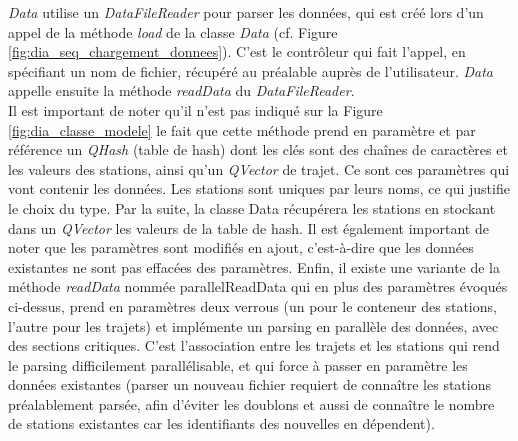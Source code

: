 \documentclass[12pt]{article}
\begin{document}
		\textit{Data} utilise un \textit{DataFileReader} pour parser les données, qui est créé lors d’un appel de la méthode \textit{load} de la classe \textit{Data} (cf. Figure \ref{fig:dia_seq_chargement_donnees}). C’est le contrôleur qui fait l’appel, en spécifiant un nom de fichier, récupéré au préalable auprès de l’utilisateur. \textit{Data} appelle ensuite la méthode \textit{readData} du \textit{DataFileReader}.\\
	
		Il est important de noter qu’il n’est pas indiqué sur la Figure \ref{fig:dia_classe_modele} le fait que cette méthode prend en paramètre et par référence un \textit{QHash} (table de hash) dont les clés sont des chaînes de caractères et les valeurs des stations, ainsi qu’un \textit{QVector} de trajet. Ce sont ces paramètres qui vont contenir les données. Les stations sont uniques par leurs noms, ce qui justifie le choix du type. Par la suite, la classe Data récupérera les stations en stockant dans un \textit{QVector} les valeurs de la table de hash. Il est également important de noter que les paramètres sont modifiés en ajout, c’est-à-dire que les données existantes ne sont pas effacées des paramètres. Enfin, il existe une variante de la méthode \textit{readData} nommée parallelReadData qui en plus des paramètres évoqués ci-dessus, prend en paramètres deux verrous (un pour le conteneur des stations, l’autre pour les trajets) et implémente un parsing en parallèle des données, avec des sections critiques. C’est l’association entre les trajets et les stations qui rend le parsing difficilement parallélisable, et qui force à passer en paramètre les données existantes (parser un nouveau fichier requiert de connaître les stations préalablement parsée, afin d’éviter les doublons et aussi de connaître le nombre de stations existantes car les identifiants des nouvelles en dépendent).\\
		
\end{document}
